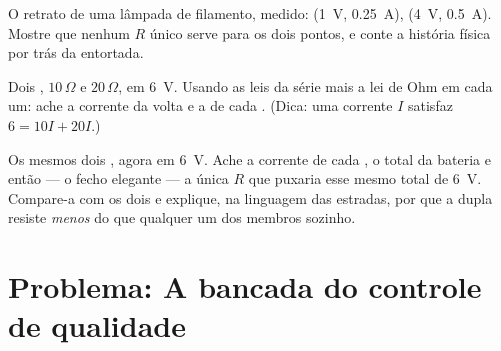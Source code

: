 \begin{exercise}[$\star\star$]\label{exo:g8:ohms-law:10}
O retrato de uma lâmpada de filamento, medido: (\qty{1}{V},
\qty{0.25}{A}), (\qty{4}{V}, \qty{0.5}{A}). Mostre que nenhum $R$
único serve para os dois pontos, e conte a história física por trás
da entortada.
\end{exercise}

\begin{exercise}[$\star\star$]\label{exo:g8:ohms-law:11}
Dois  , $10\,\Omega$ e $20\,\Omega$, em
\qty{6}{V}. Usando as leis da série mais a lei de Ohm em cada um:
ache a corrente da volta e a  de cada . (Dica: uma
corrente $I$ satisfaz $6 = 10 I + 20 I$.)
\end{exercise}

\begin{exercise}[$\star\star\star$]\label{exo:g8:ohms-law:12}
Os mesmos dois , agora  em \qty{6}{V}. Ache a
corrente de cada , o total da bateria e então --- o fecho
elegante --- a  única $R$ que puxaria esse mesmo total de
\qty{6}{V}. Compare-a com os dois  e explique, na linguagem
das estradas, por que a dupla resiste \emph{menos} do que qualquer um
dos membros sozinho.
\end{exercise}

\section{Problema: A bancada do controle de qualidade}

